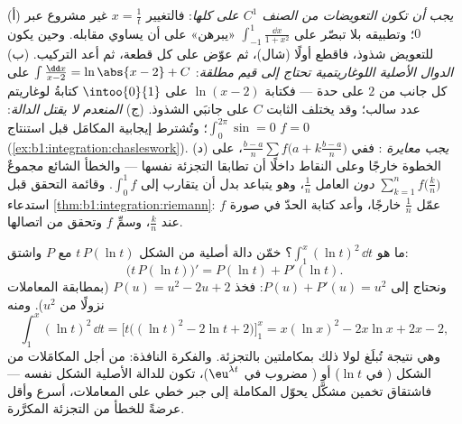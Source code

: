 \begin{remark}
(أ) \emph{يجب أن تكون التعويضات من الصنف $C^1$ على  كلها}:
فالتغيير $x = \frac1t$ غير مشروع عبر $0$؛ وتطبيقه بلا تبصّر
على $\int_{-1}^{1}\frac{\dd x}{1 + x^2}$ «يبرهن» على أن
 يساوي مقابله. وحين يكون للتعويض
شذوذ، فاقطع  أولًا (شال)، ثم عوّض على
كل قطعة، ثم أعد التركيب. (ب) \emph{الدوال الأصلية
اللوغاريتمية تحتاج إلى قيم مطلقة}: $\int \frac{\dd x}{x - 2} =
\ln\abs{x - 2} + C$ على كل جانب من $2$ على حدة --- فكتابة
$\ln(x - 2)$ على $\intoo{0}{1}$ كتابةُ لوغاريتم عدد
سالب؛ وقد يختلف الثابت $C$ على جانبَي
الشذوذ. (ج) \emph{ المنعدم لا
يقتل الدالة}: $\int_0^{2\pi}\sin = 0$؛ وتُشترط إيجابية
المكامَل قبل استنتاج $f = 0$
(\cref{ex:b1:integration:chasleswork}). (د) \emph{يجب معايرة }: ففي $\frac{b-a}{n}\sum f\bigl(a +
k\frac{b-a}{n}\bigr)$، على الخطوة خارجًا وعلى النقاط داخلًا
أن تطابقا التجزئة نفسها --- والخطأ الشائع مجموعٌ
$\sum_{k=1}^{n} f\bigl(\frac kn\bigr)$ \emph{دون} العامل
$\frac1n$، وهو يتباعد بدل أن يتقارب إلى $\int_0^1
f$. وقائمة التحقق قبل استدعاء \cref{thm:b1:integration:riemann}:
عمّل $\frac1n$ خارجًا، وأعد كتابة الحدّ في صورة $f$ عند $\frac kn$،
وسمِّ $f$ وتحقق من اتصالها.
\end{remark}

\begin{example}[خمّن، ثم اشتق، ثم عدّل]\label{ex:b1:integration:guessdiff}
ما هو $\int_1^x (\ln t)^2\,\dd t$؟ خمّن دالة أصلية من
الشكل $t\,P(\ln t)$ مع $P$  واشتق:
\[
\bigl(t\,P(\ln t)\bigr)' = P(\ln t) + P'(\ln t) .
\]
ونحتاج إلى $P(u) + P'(u) = u^2$: فخذ $P(u) = u^2 - 2u + 2$
(بمطابقة المعاملات نزولًا من $u^2$). ومنه
\[
\int_1^x (\ln t)^2\,\dd t
= \bigl[t\bigl((\ln t)^2 - 2\ln t + 2\bigr)\bigr]_1^x
= x(\ln x)^2 - 2x\ln x + 2x - 2 ,
\]
وهي نتيجة تُبلَغ لولا ذلك بمكاملتين بالتجزئة. والفكرة
النافذة: من أجل المكامَلات من الشكل
( في $\ln t$) أو ( مضروب في $\eu^{\lambda t}$)،
تكون للدالة الأصلية الشكل نفسه --- فاشتقاق تخمين مشكَّل
يحوّل المكاملة إلى جبر خطي على المعاملات،
أسرع وأقل عرضةً للخطأ من التجزئة المكرَّرة.
\end{example}


